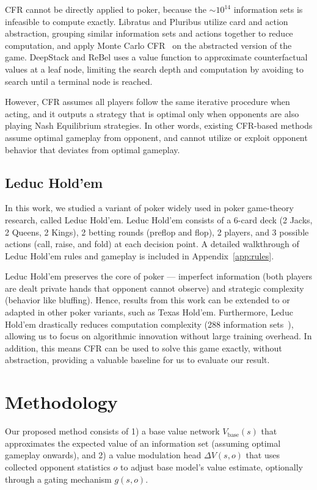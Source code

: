 \documentclass{article}
\begin{document}
CFR cannot be directly applied to poker, because the ${\sim}10^{14}$ information sets is infeasible to compute exactly. Libratus and Pluribus utilize card and action abstraction, grouping similar information sets and actions together to reduce computation, and apply Monte Carlo CFR~\citep{ref5} on the abstracted version of the game. DeepStack and ReBel uses a value function to approximate counterfactual values at a leaf node, limiting the search depth and computation by avoiding to search until a terminal node is reached.

However, CFR assumes all players follow the same iterative procedure when acting, and it outputs a strategy that is optimal only when opponents are also playing Nash Equilibrium strategies. In other words, existing CFR-based methods assume optimal gameplay from opponent, and cannot utilize or exploit opponent behavior that deviates from optimal gameplay.

\subsection{Leduc Hold'em}

In this work, we studied a variant of poker widely used in poker game-theory research, called Leduc Hold'em. Leduc Hold'em consists of a 6-card deck (2 Jacks, 2 Queens, 2 Kings), 2 betting rounds (preflop and flop), 2 players, and 3 possible actions (call, raise, and fold) at each decision point. A detailed walkthrough of Leduc Hold'em rules and gameplay is included in Appendix~\ref{app:rules}.

Leduc Hold'em preserves the core of poker --- imperfect information (both players are dealt private hands that opponent cannot observe) and strategic complexity (behavior like bluffing). Hence, results from this work can be extended to or adapted in other poker variants, such as Texas Hold'em. Furthermore, Leduc Hold'em drastically reduces computation complexity (288 information sets~\citep{ref7}), allowing us to focus on algorithmic innovation without large training overhead. In addition, this means CFR can be used to solve this game exactly, without abstraction, providing a valuable baseline for us to evaluate our result.

\section{Methodology}

Our proposed method consists of 1) a base value network $V_{\text{base}}(s)$ that approximates the expected value of an information set (assuming optimal gameplay onwards), and 2) a value modulation head $\Delta V(s,o)$ that uses collected opponent statistics $o$ to adjust base model's value estimate, optionally through a gating mechanism $g(s,o)$.
\end{document}
